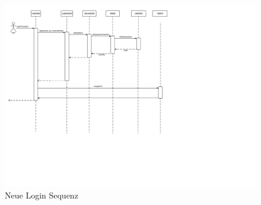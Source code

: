 \begin{figure}
  \centering
    \includegraphics[width=\linewidth]{Login-Sequenz-new.svg}
   \caption{Neue Login Sequenz}
\end{figure}


